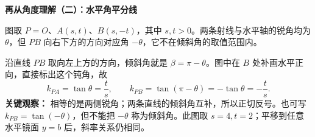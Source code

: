 \clearpage
\begin{explanationbox}
\textbf{再从角度理解（二）：水平角平分线}
\begin{center}

\end{center}
图取 $P=O$、$A(s,t)$、$B(s,-t)$，其中 $s,t>0$。两条射线与水平轴的锐角均为 $\theta$，但 $PB$ 向右下方的方向对应角 $-\theta$，它不在倾斜角的取值范围内。

\medskip
沿直线 $PB$ 取向左上方的方向，倾斜角就是 $\beta=\pi-\theta$。图中在 $B$ 处补画水平正向，直接标出这个钝角，故
\[
k_{PA}=\tan\theta=\frac ts,\qquad
k_{PB}=\tan(\pi-\theta)=-\tan\theta=-\frac ts.
\]
\textbf{关键观察：} 相等的是两侧锐角；两条直线的倾斜角互补，所以正切反号。也可写 $k_{PB}=\tan(-\theta)$，但不能把 $-\theta$ 称为倾斜角。此图取 $s=4,t=2$；平移到任意水平镜面 $y=b$ 后，斜率关系仍相同。
\end{explanationbox}
